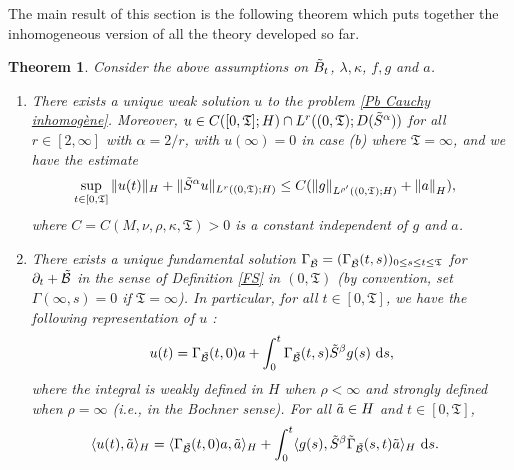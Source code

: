 \documentclass[11pt, letterpaper]{amsart}
\newtheorem{thm}{Theorem}[section]
\theoremstyle{definition}
\theoremstyle{remark}
\numberwithin{equation}{section}
\begin{document}
The main result of this section is the following theorem which puts together the inhomogeneous version of all the theory developed so far.
\begin{thm}\label{ThmCauchy inhomog} Consider the above assumptions on $\Tilde{B}_t$, $\lambda,\kappa$, $f, g$ and $a$. 
\begin{enumerate}
        \item There exists a unique weak solution $u$ to the problem \eqref{Pb Cauchy inhomogène}. Moreover,  
      $u \in C([0,\mathfrak{T}];H) \cap L^r((0,\mathfrak{T});D(\Tilde{S}^\alpha))$ for all $r\in [2,\infty]$ with $\alpha=2/r$, with $u(\infty)=0$ in case (b) where $\mathfrak{T}=\infty$, and we have the estimate
        \begin{align*}
            \sup_{t\in [0,\mathfrak{T}]} \| u(t) \|_{H}&+\| \Tilde{S}^\alpha u \|_{L^r((0,\mathfrak{T});H)} 
            \leq C  (  
            \left \| g \right \|_{L^{\rho'}((0,\mathfrak{T});H)}+ \left \| a \right \|_H  ),
        \end{align*} 
        where $C=C(M,\nu,\rho,\kappa,\mathfrak{T})>0$ is a constant independent of $g$ and $a$.
        \item There exists a unique fundamental solution $\Gamma_{\Tilde{\mathcal{B}}}=(\Gamma_{\Tilde{\mathcal{B}}}(t,s))_{0\leq s \leq t \leq \mathfrak{T}}$  for $\partial_t+\Tilde{\mathcal{B}}$ in the sense of Definition \ref{FS} in $(0,\mathfrak{T})$ (by convention, set $\Gamma(\infty,s)=0$ if $\mathfrak{T}=\infty$). In particular, for all $t \in [0,\mathfrak{T}]$, we have the following representation of $u$ : 
        \begin{align*}
            u(t)=\Gamma_{\Tilde{\mathcal{B}}}(t,0)a+\int_{0}^{t}\Gamma_{\Tilde{\mathcal{B}}}(t,s)\Tilde{S}^\beta {g}(s) \ \mathrm ds , 
        \end{align*}
         where the  integral is weakly defined in $H$ when $\rho<\infty$ and strongly defined when $\rho=\infty$ (i.e., in the Bochner sense). 
         For all $\Tilde{a} \in H$ and $t \in [0,\mathfrak{T}]$,
        \begin{align*}\label{eq:repCauchy0 T}
            \langle u(t) , \Tilde{a}\rangle_H &= \langle \Gamma_{\Tilde{\mathcal{B}}}(t,0)a , \Tilde{a}\rangle_H   
           +\int_{0}^{t} \langle {g}(s) ,  \Tilde{S}^\beta \Tilde{\Gamma}_{\Tilde{\mathcal{B}}}(s,t)\Tilde{a}\rangle_H \ \mathrm ds. 
        \end{align*}
    \end{enumerate}
\end{thm}
\end{document}
